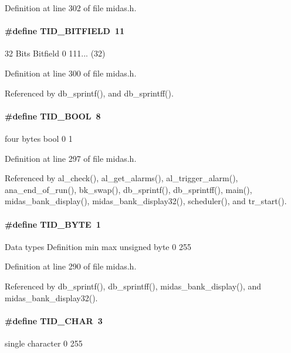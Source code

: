 Definition at line 302 of file midas.h.
\paragraph[{TID\_\-BITFIELD}]{\setlength{\rightskip}{0pt plus 5cm}\#define TID\_\-BITFIELD~11}\hfill\label{group__mdefineh_gab0a4dbaa6dd29b5b9708a242c16ddaf2}
32 Bits Bitfield 0 111... (32) 

Definition at line 300 of file midas.h.

Referenced by db\_\-sprintf(), and db\_\-sprintff().
\paragraph[{TID\_\-BOOL}]{\setlength{\rightskip}{0pt plus 5cm}\#define TID\_\-BOOL~8}\hfill\label{group__mdefineh_ga252eb84661dfaa5959b5cb316117d696}
four bytes bool 0 1 

Definition at line 297 of file midas.h.

Referenced by al\_\-check(), al\_\-get\_\-alarms(), al\_\-trigger\_\-alarm(), ana\_\-end\_\-of\_\-run(), bk\_\-swap(), db\_\-sprintf(), db\_\-sprintff(), main(), midas\_\-bank\_\-display(), midas\_\-bank\_\-display32(), scheduler(), and tr\_\-start().
\paragraph[{TID\_\-BYTE}]{\setlength{\rightskip}{0pt plus 5cm}\#define TID\_\-BYTE~1}\hfill\label{group__mdefineh_ga7499d3aa0ca98d255f5147494ab4f572}
Data types Definition min max unsigned byte 0 255 

Definition at line 290 of file midas.h.

Referenced by db\_\-sprintf(), db\_\-sprintff(), midas\_\-bank\_\-display(), and midas\_\-bank\_\-display32().
\paragraph[{TID\_\-CHAR}]{\setlength{\rightskip}{0pt plus 5cm}\#define TID\_\-CHAR~3}\hfill\label{group__mdefineh_gad4af77af5f2910e73596592030e37ab7}
single character 0 255 

